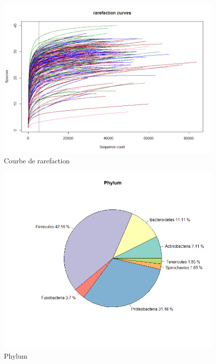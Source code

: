 \documentclass[12pt,a4paper]{article}
\begin{document}
\begin{figure}[ht]
\begin{center}
\includegraphics[scale=0.5]{img/rarefaction.png}\hfill
\end{center}
\caption{Courbe de rarefaction}
\label{rarefaction}
\end{figure}


\begin{figure}[!ht]
\begin{center}
\includegraphics[scale=0.5]{img/phylum.png}\hfill
\end{center}
\caption{Phylum}
\label{phylum}
\end{figure}
\end{document}
